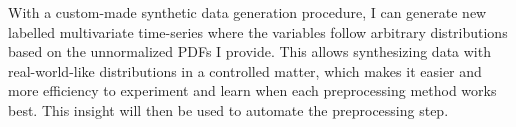 \documentclass[portrait,final,x11names,a1paper,fontscale=0.4]{baposter}
\begin{document}
\begin{poster}
{\noindent
With a custom-made synthetic data  generation procedure, I can generate new
labelled multivariate time-series where the variables follow arbitrary distributions based on the
unnormalized PDFs I provide. This allows synthesizing data with real-world-like distributions
in a controlled matter, which makes it easier and more efficiency to experiment and learn
when each preprocessing method works best. This insight will then be used to automate the
preprocessing step.




}

\end{poster}
\end{document}
